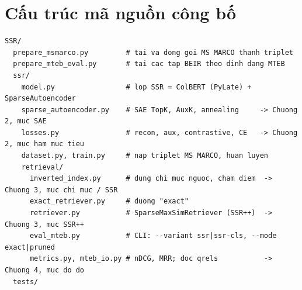 \documentclass[a4paper,13pt]{extreport}
\theoremstyle{plain}
\begin{document}
\section{Cấu trúc mã nguồn công bố}
\begin{lstlisting}[style=shell, caption={Các thành phần chính của repository SSR và phần tương ứng trong báo cáo.}]
SSR/
  prepare_msmarco.py         # tai va dong goi MS MARCO thanh triplet
  prepare_mteb_eval.py       # tai cac tap BEIR theo dinh dang MTEB
  ssr/
    model.py                 # lop SSR = ColBERT (PyLate) + SparseAutoencoder
    sparse_autoencoder.py    # SAE TopK, AuxK, annealing     -> Chuong 2, muc SAE
    losses.py                # recon, aux, contrastive, CE   -> Chuong 2, muc ham muc tieu
    dataset.py, train.py     # nap triplet MS MARCO, huan luyen
    retrieval/
      inverted_index.py      # dung chi muc nguoc, cham diem  -> Chuong 3, muc chi muc / SSR
      exact_retriever.py     # duong "exact"
      retriever.py           # SparseMaxSimRetriever (SSR++)  -> Chuong 3, muc SSR++
      eval_mteb.py           # CLI: --variant ssr|ssr-cls, --mode exact|pruned
      metrics.py, mteb_io.py # nDCG, MRR; doc qrels           -> Chuong 4, muc do do
  tests/
\end{lstlisting}
\end{document}
